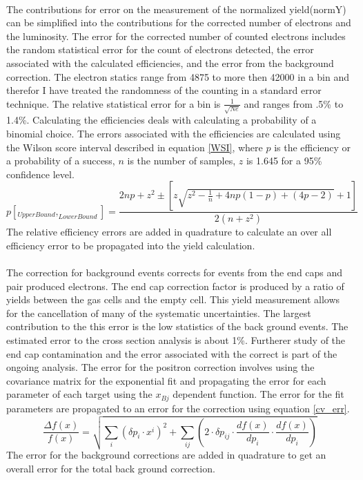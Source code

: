 \paragraph{}
The contributions for error on the measurement of the normalized yield(normY) can be simplified into the contributions for the corrected number of electrons and the luminosity. The error for the corrected number of counted electrons includes the random statistical error for the count of electrons detected, the error associated with the calculated efficiencies, and the error from the background correction. The electron statics range from 4875 to more then 42000 in a bin and therefor I have treated the randomness of the counting in a standard error technique. The relative statistical error for a bin is $\frac{1}{\sqrt{Ne}}$ and ranges from .5\% to 1.4\%. Calculating the efficiencies deals with calculating a probability of a binomial choice. The errors associated with the efficiencies are calculated using the Wilson score interval described in equation \ref{WSI}, where $p$ is the efficiency or a probability of a success, $n$ is the number of samples, $z$ is 1.645 for a 95\% confidence level. 
\begin{equation}
p[_{UpperBound},_{LowerBound}] = \frac{ 2np +z^2 \pm \left[z\sqrt{z^2 - \frac{1}{n} + 4np(1-p) +(4p-2)} + 1 \right]}{2(n+z^2)} \label{WSI}
\end{equation}
The relative efficiency errors are added in quadrature to calculate an over all efficiency error to be propagated into the yield calculation.
\paragraph{}The correction for background events corrects for events from the end caps and pair produced electrons. The end cap correction factor is produced by a ratio of yields between the gas cells and the empty cell. This yield measurement allows for the cancellation of many of the systematic uncertainties. The largest contribution to the this error is the low statistics of the back ground events. The estimated error to the cross section analysis is about 1\%. Furtherer study of the end cap contamination and the error associated with the correct is part of the ongoing analysis. The error for the positron correction involves using the covariance matrix for the exponential fit and propagating the error for each parameter of each target using the $x_{Bj}$ dependent function. The error for the fit parameters are propagated to an error for the correction using equation \ref{cv_err}.
\begin{equation}
\frac{\Delta f(x)}{f(x)} =  \sqrt{ \sum_{i}^{} \left(\delta p_i\cdot x^i\right)^2 + \sum_{ij}^{}\left( 2\cdot \delta p_{ij}\cdot \dfrac{df(x)}{dp_i}\cdot \dfrac{df(x)}{dp_i}\right) } \label{cv_err}
\end{equation}
The error for the background corrections are added in quadrature to get an overall error for the total back ground correction.  
